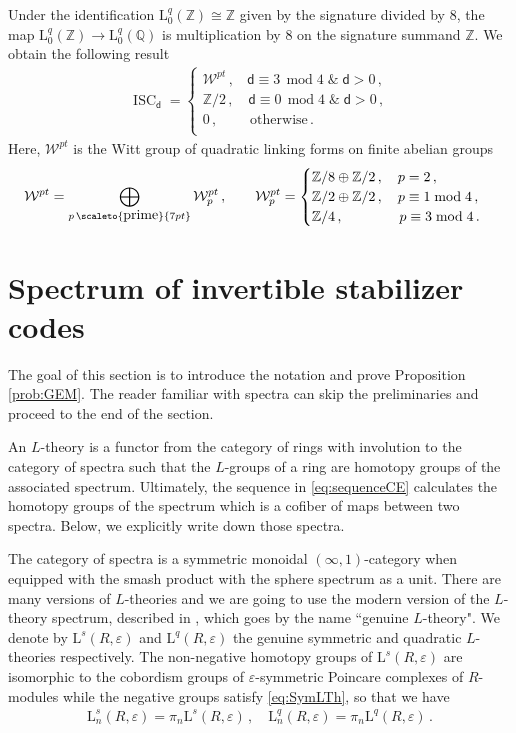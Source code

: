 \documentclass[sn-mathphys-num]{sn-jnl}
\theoremstyle{definition}
\numberwithin{equation}{section}
\theoremstyle{definition}
\def\CW {{\mathcal W}}
\def\L{{\mbox{L}}}
\def\ep{\varepsilon}
\def\IQ{\mathbb{Q}}
\def\IZ{{\mathbb{Z}}}
\newcommand{\dd}{{\mathsf{d}}} %
\begin{document}
Under the identification $\L^q_0(\IZ)\cong\IZ$ given by the signature divided by $8$, the map $\L^q_0(\IZ)\to \L_0^q(\IQ)$ is multiplication by $8$ on the signature summand $\IZ$. We obtain the following result
\begin{align}\label{eq:CliffordPhases}
\operatorname{ISC}_\dd=\begin{cases}\CW^{pt}\,,\;\;\,\, \dd\equiv 3\;\,\mbox{mod}\;4\; \&\; \dd>0\,,\\
  \IZ/2\,,\quad \dd\equiv 0\;\,\mbox{mod}\;4\; \&\; \dd>0\,,\\
  0\,,\quad\quad\; \mbox{otherwise}\,.\\
  \end{cases}
\end{align}
Here, $\CW^{pt}$ is the Witt group of quadratic linking forms on finite abelian groups
\begin{align}\label{eq:witt_groups_quad_forms}
\CW^{pt}= \bigoplus_{p\,\scaleto{\mbox{prime}}{7pt}}\CW^{pt}_p\,,\quad\quad
   \CW^{pt}_p= \begin{cases}
        \IZ/8\oplus \IZ/2\,,\quad p=2\,,\\
        \IZ/2\oplus \IZ/2\,,\quad p\equiv 1\;\mbox{mod}\;4\,,\\
        \IZ/4\,,\quad\quad \quad\quad p\equiv 3\;\mbox{mod}\;4\,.
    \end{cases}
\end{align}

\section{Spectrum of invertible stabilizer codes}\label{sec:Lspectra}
 The goal of this section is to introduce the notation and prove Proposition \ref{prob:GEM}. The reader familiar with spectra can skip the preliminaries and proceed to the end of the section. 

An $L$-theory is a functor from the category of rings with involution to the category of spectra \cite{ranicki1992algebraic,calmes2020hermitian1} such that the $L$-groups of a ring are homotopy groups of the associated spectrum. Ultimately, the sequence in \eqref{eq:sequenceCE} calculates the homotopy groups of the spectrum which is a cofiber of maps between two spectra. Below, we explicitly write down those spectra.

The category of spectra is a symmetric monoidal $(\infty,1)$-category when equipped with the smash product with the sphere spectrum as a unit. There are many versions of $L$-theories \cite{RanickiAlgThofSurgery1,ranicki1992algebraic} and we are going to use the modern version of the $L$-theory spectrum, described in \cite{calmes2020hermitian3}, which goes by the name ``genuine $L$-theory". We denote by  $\L^s(R,\ep)$ and $\L^{q}(R,\ep)$ the genuine symmetric and quadratic $L$-theories respectively. The non-negative homotopy groups of $\L^s(R,\ep)$ are isomorphic to the cobordism groups of $\ep$-symmetric Poincare complexes of $R$-modules while the negative groups satisfy \eqref{eq:SymLTh}, so that we have 
\begin{align}
    \L^s_n(R,\ep)=\pi_n\L^s(R,\ep)\,,\quad \L^q_n(R,\ep)=\pi_n\L^q(R,\ep)\,.
\end{align}
\end{document}

